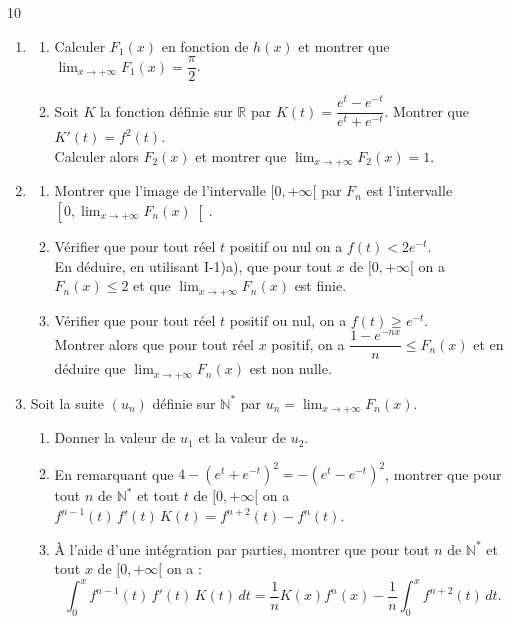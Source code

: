 \documentclass{axiobac}
\begin{document}
\begin{probleme}{10}
\begin{enumerate}
    \item
    \begin{enumerate}
        \item Calculer $F_1(x)$ en fonction de $h(x)$ et montrer que $\displaystyle\lim_{x \to +\infty} F_1(x) = \dfrac{\pi}{2}$.
        \item Soit $K$ la fonction définie sur $\mathbb{R}$ par $K(t) = \dfrac{e^{t} - e^{-t}}{e^{t} + e^{-t}}$. Montrer que $K'(t) = f^2(t)$. \\
        Calculer alors $F_2(x)$ et montrer que $\displaystyle\lim_{x \to +\infty} F_2(x) = 1$.
    \end{enumerate}
    \item
    \begin{enumerate}
        \item Montrer que l'image de l'intervalle $[0, +\infty[$ par $F_n$ est l'intervalle $\left[0, \displaystyle\lim_{x \to +\infty} F_n(x)\right[$.
        \item Vérifier que pour tout réel $t$ positif ou nul on a $f(t) < 2e^{-t}$. \\
        En déduire, en utilisant I-1)a), que pour tout $x$ de $[0, +\infty[$ on a $F_n(x) \leqslant 2$ et que $\displaystyle\lim_{x \to +\infty} F_n(x)$ est finie.
        \item Vérifier que pour tout réel $t$ positif ou nul, on a $f(t) \geqslant e^{-t}$. \\
        Montrer alors que pour tout réel $x$ positif, on a $\dfrac{1 - e^{-nx}}{n} \leqslant F_n(x)$ et en déduire que $\displaystyle\lim_{x \to +\infty} F_n(x)$ est non nulle.
    \end{enumerate}
    \item Soit la suite $(u_n)$ définie sur $\mathbb{N}^*$ par $u_n = \displaystyle\lim_{x \to +\infty} F_n(x)$.
    \begin{enumerate}
        \item Donner la valeur de $u_1$ et la valeur de $u_2$.
        \item En remarquant que $4 - (e^{t} + e^{-t})^2 = -(e^{t} - e^{-t})^2$, montrer que pour tout $n$ de $\mathbb{N}^*$ et tout $t$ de $[0, +\infty[$ on a $f^{n-1}(t)\, f'(t)\, K(t) = f^{n+2}(t) - f^{n}(t)$.
        \item À l'aide d'une intégration par parties, montrer que pour tout $n$ de $\mathbb{N}^*$ et tout $x$ de $[0, +\infty[$ on a :
        \[
        \int_0^x f^{n-1}(t)\, f'(t)\, K(t)\,dt = \frac{1}{n} K(x) f^{n}(x) - \frac{1}{n} \int_0^x f^{n+2}(t)\,dt .
\]
\end{enumerate}
\end{enumerate}
\end{probleme}
\end{document}
